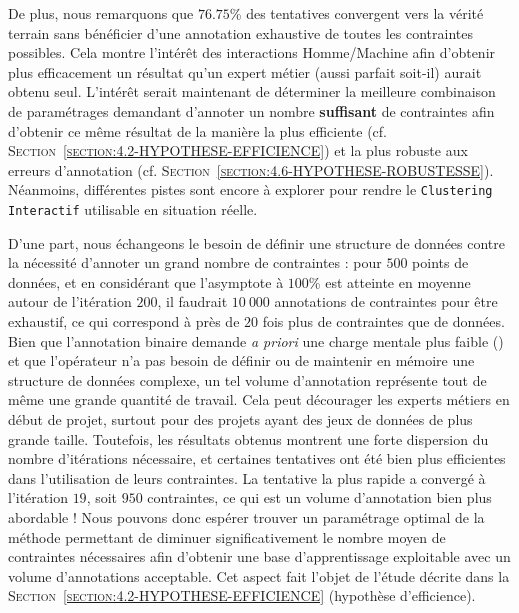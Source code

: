 			De plus, nous remarquons que $76.75$\% des tentatives convergent vers la vérité terrain sans bénéficier d'une annotation exhaustive de toutes les contraintes possibles.
			Cela montre l'intérêt des interactions Homme/Machine afin d'obtenir plus efficacement un résultat qu'un expert métier (aussi parfait soit-il) aurait obtenu seul. 
			L'intérêt serait maintenant de déterminer la meilleure combinaison de paramétrages demandant d'annoter un nombre \textbf{suffisant} de contraintes afin d'obtenir ce même résultat de la manière la plus efficiente (cf. \textsc{Section~\ref{section:4.2-HYPOTHESE-EFFICIENCE}}) et la plus robuste aux erreurs d'annotation (cf. \textsc{Section~\ref{section:4.6-HYPOTHESE-ROBUSTESSE}}).
			\\

			
			Néanmoins, différentes pistes sont encore à explorer pour rendre le \texttt{Clustering Interactif} utilisable en situation réelle.
			
			D'une part, nous échangeons le besoin de définir une structure de données contre la nécessité d'annoter un grand nombre de contraintes : pour $500$ points de données, et en considérant que l'asymptote à $100$\% est atteinte en moyenne autour de l'itération $200$, il faudrait $10~000$ annotations de contraintes pour être exhaustif, ce qui correspond à près de $20$ fois plus de contraintes que de données.
			Bien que l'annotation binaire demande \textit{a priori} une charge mentale plus faible (\cite{hart-staveland:1988:development-nasatlx-task}) et que l'opérateur n'a pas besoin de définir ou de maintenir en mémoire une structure de données complexe, un tel volume d'annotation représente tout de même une grande quantité de travail.
			Cela peut décourager les experts métiers en début de projet, surtout pour des projets ayant des jeux de données de plus grande taille.
			Toutefois, les résultats obtenus montrent une forte dispersion du nombre d'itérations nécessaire, et certaines tentatives ont été bien plus efficientes dans l'utilisation de leurs contraintes. La tentative la plus rapide a convergé à l'itération $19$, soit $950$ contraintes, ce qui est un volume d'annotation bien plus abordable !
			Nous pouvons donc espérer trouver un paramétrage optimal de la méthode permettant de diminuer significativement le nombre moyen de contraintes nécessaires afin d'obtenir une base d'apprentissage exploitable avec un volume d'annotations acceptable.
			Cet aspect fait l'objet de l'étude décrite dans la \textsc{Section~\ref{section:4.2-HYPOTHESE-EFFICIENCE}} (hypothèse d'efficience).
			
